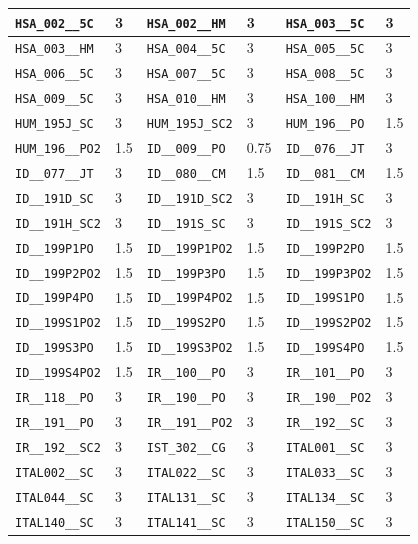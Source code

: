 \begin{longtable}{|l|l||l|l||l|l|}
    \verb|HSA_002__5C| & 3 & \verb|HSA_002__HM| & 3 & \verb|HSA_003__5C| & 3\\\hline
    \verb|HSA_003__HM| & 3 & \verb|HSA_004__5C| & 3 & \verb|HSA_005__5C| & 3\\\hline
    \verb|HSA_006__5C| & 3 & \verb|HSA_007__5C| & 3 & \verb|HSA_008__5C| & 3\\\hline
    \verb|HSA_009__5C| & 3 & \verb|HSA_010__HM| & 3 & \verb|HSA_100__HM| & 3\\\hline
    \verb|HUM_195J_SC| & 3 & \verb|HUM_195J_SC2| & 3 & \verb|HUM_196__PO| & 1.5\\\hline
    \verb|HUM_196__PO2| & 1.5 & \verb|ID__009__PO| & 0.75 & \verb|ID__076__JT| & 3\\\hline
    \verb|ID__077__JT| & 3 & \verb|ID__080__CM| & 1.5 & \verb|ID__081__CM| & 1.5\\\hline
    \verb|ID__191D_SC| & 3 & \verb|ID__191D_SC2| & 3 & \verb|ID__191H_SC| & 3\\\hline
    \verb|ID__191H_SC2| & 3 & \verb|ID__191S_SC| & 3 & \verb|ID__191S_SC2| & 3\\\hline
    \verb|ID__199P1PO| & 1.5 & \verb|ID__199P1PO2| & 1.5 & \verb|ID__199P2PO| & 1.5\\\hline
    \verb|ID__199P2PO2| & 1.5 & \verb|ID__199P3PO| & 1.5 & \verb|ID__199P3PO2| & 1.5\\\hline
    \verb|ID__199P4PO| & 1.5 & \verb|ID__199P4PO2| & 1.5 & \verb|ID__199S1PO| & 1.5\\\hline
    \verb|ID__199S1PO2| & 1.5 & \verb|ID__199S2PO| & 1.5 & \verb|ID__199S2PO2| & 1.5\\\hline
    \verb|ID__199S3PO| & 1.5 & \verb|ID__199S3PO2| & 1.5 & \verb|ID__199S4PO| & 1.5\\\hline
    \verb|ID__199S4PO2| & 1.5 & \verb|IR__100__PO| & 3 & \verb|IR__101__PO| & 3\\\hline
    \verb|IR__118__PO| & 3 & \verb|IR__190__PO| & 3 & \verb|IR__190__PO2| & 3\\\hline
    \verb|IR__191__PO| & 3 & \verb|IR__191__PO2| & 3 & \verb|IR__192__SC| & 3\\\hline
    \verb|IR__192__SC2| & 3 & \verb|IST_302__CG| & 3 & \verb|ITAL001__SC| & 3\\\hline
    \verb|ITAL002__SC| & 3 & \verb|ITAL022__SC| & 3 & \verb|ITAL033__SC| & 3\\\hline
    \verb|ITAL044__SC| & 3 & \verb|ITAL131__SC| & 3 & \verb|ITAL134__SC| & 3\\\hline
    \verb|ITAL140__SC| & 3 & \verb|ITAL141__SC| & 3 & \verb|ITAL150__SC| & 3\\\hline

\end{longtable}
